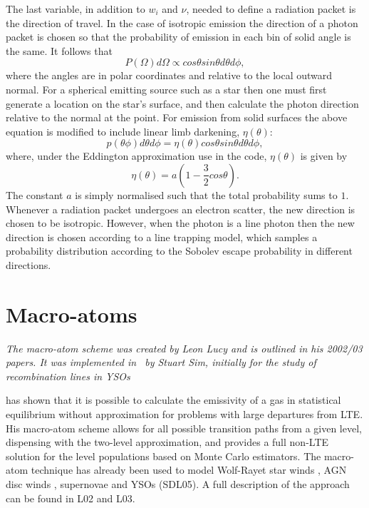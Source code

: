 The last variable, in addition to $w_i$ and $\nu$, needed to define a 
radiation packet is the direction of travel.
In the case of isotropic emission the direction of a photon packet
is chosen so that the probability of emission in each bin of solid
angle is the same. It follows that 
\begin{equation}
P(\Omega)d\Omega \propto cos \theta sin \theta d\theta d\phi,
\end{equation}
where the angles are in polar coordinates and relative to the local
outward normal. For a spherical emitting source such as 
a star then one must first generate a location on the star's surface,
and then calculate the photon direction relative to the normal at the point.
For emission from solid surfaces the above equation is modified
to include linear limb darkening, $\eta(\theta)$:
\begin{equation}
p(\theta \phi) d\theta d\phi = \eta(\theta) cos \theta sin \theta d\theta d\phi,
\end{equation}
where, under the Eddington approximation use in the code, $\eta(\theta)$
is given by
\begin{equation}
\eta(\theta) = a (1 - \frac{3}{2} cos \theta).
\end{equation}
The constant $a$ is simply normalised such that the total probability
sums to $1$. Whenever a radiation packet undergoes an electron scatter,
the new direction is chosen to be isotropic. However,
when the photon is a line photon then the new direction is chosen
according to a line trapping model, which samples a probability 
distribution according to the Sobolev escape probability in different 
directions. 






\section{Macro-atoms}

{\sl The macro-atom scheme was created by Leon Lucy and is outlined in 
his 2002/03 papers. It was implemented in \py\ by Stuart Sim, initially
for the study of recombination lines in YSOs \citep{simmacro2005}
}

\cite{lucy2002, lucy2003}
has shown that it is possible to calculate the emissivity of a gas in
statistical equilibrium without approximation for problems with large departures
from LTE.
His macro-atom scheme allows for all possible transition paths from a given level,
dispensing with the two-level approximation, and
provides a full non-LTE solution
for the level populations based on Monte Carlo estimators. The macro-atom
technique has already been used to model Wolf-Rayet star
winds \citep{sim2004}, AGN disc winds \citep{simlong2008, tatum2012},
supernovae \citep{kromersim2009, kerzendorfsim} and YSOs (SDL05). A full 
description of the approach can be found in L02 and L03. 

